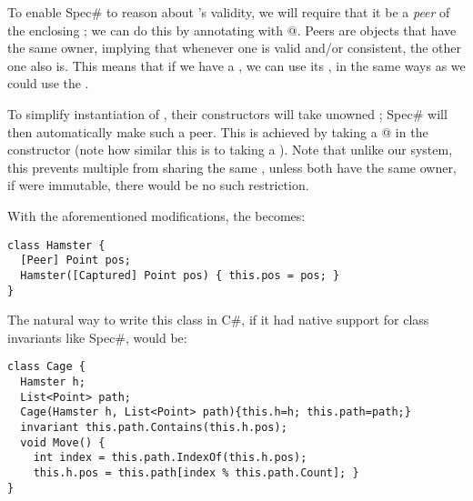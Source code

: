 To enable Spec\# to reason about \Q@pos@'s validity, we will require that it be a \emph{peer} of the enclosing \Q@Hamster@; we can do this by annotating \Q@pos@ with \Q@[Peer]@. Peers are objects that have the same owner, implying that  whenever one is valid and/or consistent, the other one also is. This means that if we have a \Q@Hamster@, we can use its \Q@pos@, in the same ways as we could use the \Q@Hamster@.

To simplify instantiation of \Q@Hamster@s, their constructors will take unowned \Q@Point@s; Spec\# will then automatically make such \Q@Point@ a peer. This is achieved by taking a \Q@[Captured]@ \Q@Point@ in the constructor (note how similar this is to taking a \Q@capsule@ \Q@Point@). Note that unlike our system, this prevents multiple \Q@Hamster@s from sharing the same \Q@Point@, unless both \Q@Hamster@s have the same owner, if \Q@Point@ were immutable, there would be no such restriction.

With the aforementioned modifications, the \Q@Hamster@ becomes:
\begin{lstlisting}
class Hamster {
  [Peer] Point pos;
  Hamster([Captured] Point pos) { this.pos = pos; }
}
\end{lstlisting}


The natural way to write this class in C\#, if it had native support for class invariants like Spec\#, would be:
\begin{lstlisting}
class Cage {
  Hamster h;
  List<Point> path;
  Cage(Hamster h, List<Point> path){this.h=h; this.path=path;}
  invariant this.path.Contains(this.h.pos);
  void Move() { 
    int index = this.path.IndexOf(this.h.pos);
    this.h.pos = this.path[index % this.path.Count]; } 
}
\end{lstlisting}

